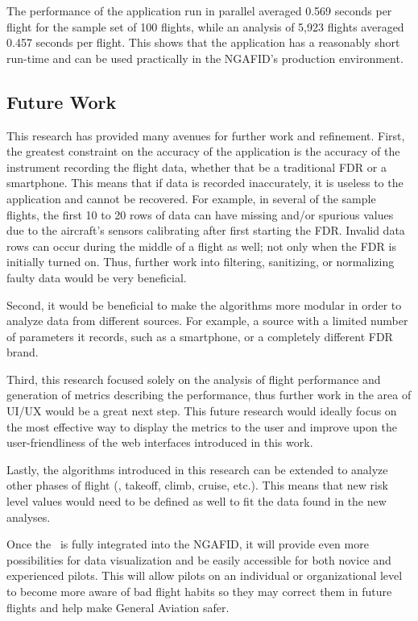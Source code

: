 	The performance of the application run in parallel averaged 0.569 seconds per flight for the sample set of 100 flights, while an analysis of 5,923 flights averaged 0.457 seconds per flight.  This shows that the application has a reasonably short run-time and can be used practically in the NGAFID's production environment.


\subsection{Future Work} \label{sec:future_work}

	This research has provided many avenues for further work and refinement.  First, the greatest constraint on the accuracy of the application is the accuracy of the instrument recording the flight data, whether that be a traditional FDR or a smartphone.  This means that if data is recorded inaccurately, it is useless to the application and cannot be recovered.  For example, in several of the sample flights, the first 10 to 20 rows of data can have missing and/or spurious values due to the aircraft's sensors calibrating after first starting the FDR.  Invalid data rows can occur during the middle of a flight as well; not only when the FDR is initially turned on.  Thus, further work into filtering, sanitizing, or normalizing faulty data would be very beneficial.
	
	Second, it would be beneficial to make the algorithms more modular in order to analyze data from different sources.  For example, a source with a limited number of parameters it records, such as a smartphone, or a completely different FDR brand.
	
	Third, this research focused solely on the analysis of flight performance and generation of metrics describing the performance, thus further work in the area of UI/UX would be a great next step.  This future research would ideally focus on the most effective way to display the metrics to the user and improve upon the user-friendliness of the web interfaces introduced in this work.
	
	Lastly, the algorithms introduced in this research can be extended to analyze other phases of flight (\eg, takeoff, climb, cruise, etc.).  This means that new risk level values would need to be defined as well to fit the data found in the new analyses.
    
    Once the \toolname\ is fully integrated into the NGAFID, it will provide even more possibilities for data visualization and be easily accessible for both novice and experienced pilots.  This will allow pilots on an individual or organizational level to become more aware of bad flight habits so they may correct them in future flights and help make General Aviation safer.